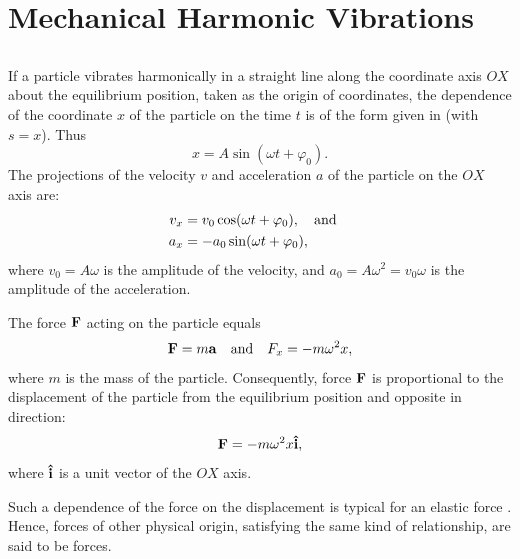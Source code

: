 \section{Mechanical Harmonic Vibrations}
\label{sec-28.2} 

\subsection{}\label{28.2.1} If a particle vibrates harmonically in a straight line along the coordinate axis $OX$ about the equilibrium position, taken as the origin of coordinates, the dependence of the coordinate $x$ of the particle on the time $t$ is of the form given in  (with $s = x$). Thus
\begin{equation*}%
x = A \sin (\omega t + \varphi_{0}).
\end{equation*}
The projections of the velocity $v$ and acceleration $a$ of the particle on the $OX$ axis are:
\begin{align*}%
v_{x} & = v_{0} \cos (\omega t + \varphi_{0}), \qand \\
a_{x} & = -a_{0} \sin (\omega t + \varphi_{0}),
\end{align*}
where $v_{0}= A \omega$ is the amplitude of the velocity, and $a_{0} = A \omega^{2} = v_{0}\omega$ is the amplitude of the acceleration.

The force $\vb{F}$ acting on the particle equals
\begin{equation*}%
\vb{F} = m \vb{a} \qand F_{x} = - m \omega^{2} x,
\end{equation*}
where $m$ is the mass of the particle. Consequently, force $\vb{F}$ is proportional to the displacement of the particle from the equilibrium position and opposite in direction:
\begin{equation*}%
\vb{F} = - m \omega^{2} x \vu{i},
\end{equation*}
where $\vu{i}$ is a unit vector of the $OX$ axis.

Such a dependence of the force on the displacement is typical for an elastic force . Hence, forces of other physical origin, satisfying the same kind of relationship, are said to be  forces.

